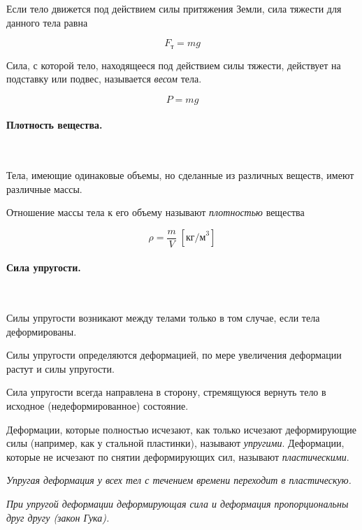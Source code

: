 \documentclass[a4paper,12pt]{article}
\begin{document}
		Если тело движется под действием силы притяжения Земли,
		сила тяжести для данного тела равна

		\begin{equation}
			F_\text{т} = mg
		\end{equation}

		Сила, с которой тело, находящееся под действием силы тяжести,
		действует на подставку или подвес, называется \textit{весом}
		тела.

		\begin{equation}
			P = mg
		\end{equation}


		\paragraph{Плотность вещества.} \

		Тела, имеющие одинаковые объемы, но сделанные из различных
		веществ, имеют различные массы.

		Отношение массы тела к его объему называют \textit{плотностью}
		вещества

		\begin{equation}
			\rho = \frac{m}{V} \; [\text{кг/м}^3]
		\end{equation}



		\paragraph{Сила упругости.} \

		Силы упругости возникают между телами только в том случае, если
		тела деформированы.

		Силы упругости определяются деформацией, по мере увеличения
		деформации растут и силы упругости.

		Сила упругости всегда направлена в сторону, стремящуюся вернуть 
		тело в исходное (недеформированное) состояние.

		Деформации, которые полностью исчезают, как только исчезают деформирующие силы 
		(например, как у стальной пластинки), называют \textit{упругими}. Деформации, 
		которые не исчезают по снятии деформирующих сил, называют \textit{пластическими}.

		\textit{Упругая деформация у всех тел с течением времени переходит в пластическую.}

		\textit{При упругой деформации деформирующая сила и деформация пропорциональны друг
		другу (закон Гука).}
\end{document}
